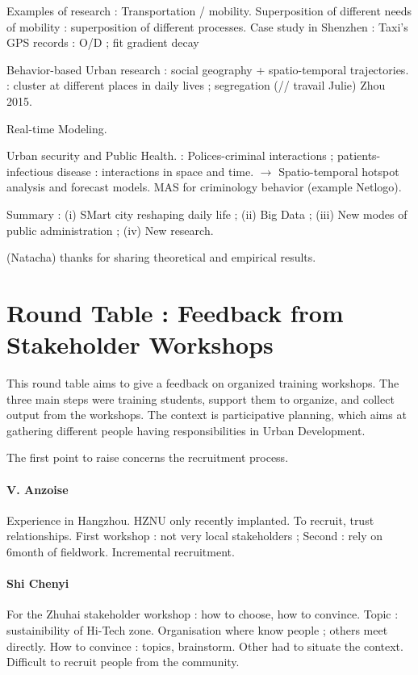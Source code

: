 \documentclass[11pt]{article}
\begin{document}
Examples of research : Transportation / mobility. Superposition of different needs of mobility : superposition of different processes. Case study in Shenzhen : Taxi's GPS records : O/D ; fit gradient decay

Behavior-based Urban research : social geography + spatio-temporal trajectories. : cluster at different places in daily lives ; segregation (// travail Julie) Zhou 2015.

Real-time Modeling.

Urban security and Public Health. : Polices-criminal interactions ; patients-infectious disease : interactions in space and time. $\rightarrow$ Spatio-temporal hotspot analysis and forecast models. MAS for criminology behavior (example Netlogo).

Summary : (i) SMart city reshaping daily life ; (ii) Big Data ; (iii) New modes of public administration ; (iv) New research.

(Natacha) thanks for sharing theoretical and empirical results.





\section*{Round Table : Feedback from Stakeholder Workshops}


This round table aims to give a feedback on organized training workshops. The three main steps were training students, support them to organize, and collect output from the workshops. The context is participative planning, which aims at gathering different people having responsibilities in Urban Development.

The first point to raise concerns the recruitment process.

\paragraph{V. Anzoise} Experience in Hangzhou. HZNU only recently implanted. To recruit, trust relationships. First workshop : not very local stakeholders ; Second : rely on 6month of fieldwork. Incremental recruitment. 

\paragraph{Shi Chenyi} For the Zhuhai stakeholder workshop : how to choose, how to convince. Topic : sustainibility of Hi-Tech zone. Organisation where know people ; others meet directly. How to convince : topics, brainstorm. Other had to situate the context. Difficult to recruit people from the community. 
\end{document}
